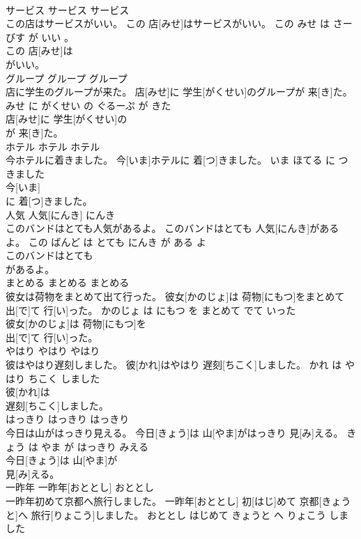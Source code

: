 \documentclass[8pt]{extreport}
\begin{document}
\begin{CJK}{UTF8}{min}
\\	サービス	サービス	サービス	
\\	この店はサービスがいい。	この 店[みせ]はサービスがいい。	この みせ は さーびす が いい 。	
\\	この 店[みせ]は
\\	がいい。			
\\	グループ	グループ	グループ	
\\	店に学生のグループが来た。	店[みせ]に 学生[がくせい]のグループが 来[き]た。	みせ に がくせい の ぐるーぷ が きた	
\\	店[みせ]に 学生[がくせい]の
\\	が 来[き]た。			
\\	ホテル	ホテル	ホテル	
\\	今ホテルに着きました。	今[いま]ホテルに 着[つ]きました。	いま ほてる に つきました	
\\	今[いま]
\\	に 着[つ]きました。			
\\	人気	人気[にんき]	にんき	
\\	このバンドはとても人気があるよ。	このバンドはとても 人気[にんき]があるよ。	この ばんど は とても にんき が ある よ	
\\	このバンドはとても
\\	があるよ。			
\\	まとめる	まとめる	まとめる	
\\	彼女は荷物をまとめて出て行った。	彼女[かのじょ]は 荷物[にもつ]をまとめて 出[で]て 行[い]った。	かのじょ は にもつ を まとめて でて いった	
\\	彼女[かのじょ]は 荷物[にもつ]を
\\	出[で]て 行[い]った。			
\\	やはり	やはり	やはり	
\\	彼はやはり遅刻しました。	彼[かれ]はやはり 遅刻[ちこく]しました。	かれ は やはり ちこく しました	
\\	彼[かれ]は
\\	遅刻[ちこく]しました。			
\\	はっきり	はっきり	はっきり	
\\	今日は山がはっきり見える。	今日[きょう]は 山[やま]がはっきり 見[み]える。	きょう は やま が はっきり みえる	
\\	今日[きょう]は 山[やま]が
\\	見[み]える。			
\\	一昨年	一昨年[おととし]	おととし	
\\	一昨年初めて京都へ旅行しました。	一昨年[おととし] 初[はじ]めて 京都[きょうと]へ 旅行[りょこう]しました。	おととし はじめて きょうと へ りょこう しました	

\end{CJK}
\end{document}
